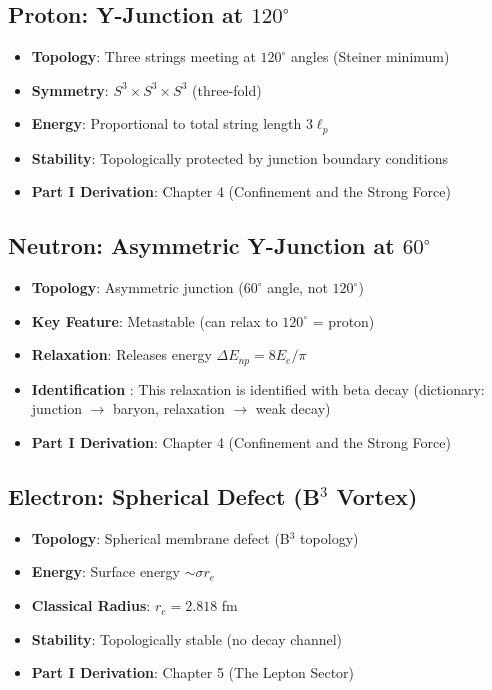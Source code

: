 \subsection{Proton: Y-Junction at $120^\circ$}

\begin{itemize}
\item \textbf{Topology}: Three strings meeting at $120^\circ$ angles (Steiner minimum)
\item \textbf{Symmetry}: $S^3 \times S^3 \times S^3$ (three-fold)
\item \textbf{Energy}: Proportional to total string length $3\ell_p$
\item \textbf{Stability}: Topologically protected by junction boundary conditions
\item \textbf{Part I Derivation}: Chapter 4 (Confinement and the Strong Force)
\end{itemize}

\subsection{Neutron: Asymmetric Y-Junction at $60^\circ$}

\begin{itemize}
\item \textbf{Topology}: Asymmetric junction ($60^\circ$ angle, not $120^\circ$) \tagDer{}
\item \textbf{Key Feature}: Metastable (can relax to $120^\circ$ = proton) \tagDer{}
\item \textbf{Relaxation}: Releases energy $\Delta E_{np} = 8E_e/\pi$ \tagDer{}
\item \textbf{Identification} \tagDc{}: This relaxation is identified with beta decay
      (dictionary: junction $\to$ baryon, relaxation $\to$ weak decay)
\item \textbf{Part I Derivation}: Chapter 4 (Confinement and the Strong Force)
\end{itemize}

\subsection{Electron: Spherical Defect (B$^3$ Vortex)}

\begin{itemize}
\item \textbf{Topology}: Spherical membrane defect (B$^3$ topology)
\item \textbf{Energy}: Surface energy $\sim \sigma r_e$
\item \textbf{Classical Radius}: $r_e = 2.818$ fm \tagBL
\item \textbf{Stability}: Topologically stable (no decay channel)
\item \textbf{Part I Derivation}: Chapter 5 (The Lepton Sector)
\end{itemize}

